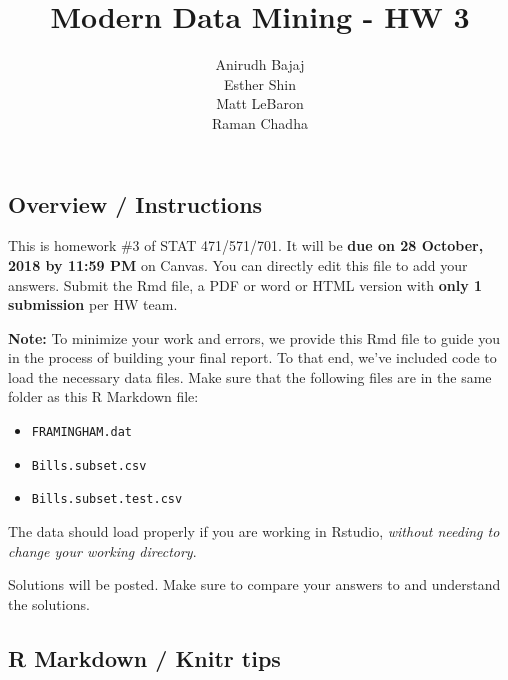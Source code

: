 \documentclass[]{article}
\title{Modern Data Mining - HW 3}
\author{Anirudh Bajaj \\ Esther Shin \\ Matt LeBaron \\ Raman Chadha}
\date{}
\newenvironment{Shaded}{\begin{snugshade}}{\end{snugshade}}
\newcommand{\KeywordTok}[1]{\textcolor[rgb]{0.13,0.29,0.53}{\textbf{#1}}}
\newcommand{\DataTypeTok}[1]{\textcolor[rgb]{0.13,0.29,0.53}{#1}}
\newcommand{\DecValTok}[1]{\textcolor[rgb]{0.00,0.00,0.81}{#1}}
\newcommand{\StringTok}[1]{\textcolor[rgb]{0.31,0.60,0.02}{#1}}
\newcommand{\CommentTok}[1]{\textcolor[rgb]{0.56,0.35,0.01}{\textit{#1}}}
\newcommand{\OperatorTok}[1]{\textcolor[rgb]{0.81,0.36,0.00}{\textbf{#1}}}
\newcommand{\NormalTok}[1]{#1}
\providecommand{\tightlist}{%
  \setlength{\itemsep}{0pt}\setlength{\parskip}{0pt}}
\begin{document}
\maketitle

\begin{Shaded}
\end{Shaded}

\subsection{Overview / Instructions}\label{overview-instructions}

This is homework \#3 of STAT 471/571/701. It will be \textbf{due on 28
October, 2018 by 11:59 PM} on Canvas. You can directly edit this file to
add your answers. Submit the Rmd file, a PDF or word or HTML version
with \textbf{only 1 submission} per HW team.

\textbf{Note:} To minimize your work and errors, we provide this Rmd
file to guide you in the process of building your final report. To that
end, we've included code to load the necessary data files. Make sure
that the following files are in the same folder as this R Markdown file:

\begin{itemize}
\tightlist
\item
  \texttt{FRAMINGHAM.dat}
\item
  \texttt{Bills.subset.csv}
\item
  \texttt{Bills.subset.test.csv}
\end{itemize}

The data should load properly if you are working in Rstudio,
\emph{without needing to change your working directory}.

Solutions will be posted. Make sure to compare your answers to and
understand the solutions.

\subsection{R Markdown / Knitr tips}\label{r-markdown-knitr-tips}
\end{document}
